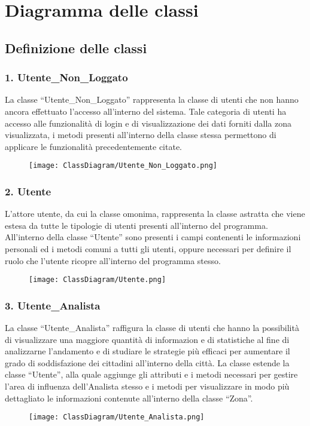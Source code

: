 \chapter{Diagramma delle classi}

\section{Definizione delle classi}

    \subsection*{1. Utente\_Non\_Loggato}
        La classe ``Utente\_Non\_Loggato'' rappresenta la classe di utenti che non hanno ancora effettuato l'accesso all'interno del sistema. Tale categoria di utenti ha accesso alle funzionalità di login e di visualizzazione dei dati forniti dalla zona visualizzata, i metodi presenti all'interno della classe stessa permettono di applicare le funzionalità precedentemente citate.
        \begin{figure}[H]
            \texttt{[image: ClassDiagram/Utente\_Non\_Loggato.png]}
        \end{figure}     

    \subsection*{2. Utente}
        L'attore utente, da cui la classe omonima, rappresenta la classe astratta che viene estesa da tutte le tipologie di utenti presenti all'interno del programma. All'interno della classe ``Utente'' sono presenti i campi contenenti le informazioni personali ed i metodi comuni a tutti gli utenti, oppure necessari per definire il ruolo che l'utente ricopre all'interno del programma stesso.
        \begin{figure}[H]
            \texttt{[image: ClassDiagram/Utente.png]}
        \end{figure}

    \subsection*{3. Utente\_Analista}
        La classe ``Utente\_Analista'' raffigura la classe di utenti che hanno la possibilità di visualizzare una maggiore quantità di informazion e di statistiche al fine di analizzarne l'andamento e di studiare le strategie più efficaci per aumentare il grado di soddisfazione dei cittadini all'interno della città. La classe estende la classe ``Utente'', alla quale aggiunge gli attributi e i metodi necessari per gestire l'area di influenza dell'Analista stesso e i metodi per visualizzare in modo più dettagliato le informazioni contenute all'interno della classe ``Zona''.
        \begin{figure}[H]
            \texttt{[image: ClassDiagram/Utente\_Analista.png]}
        \end{figure}

